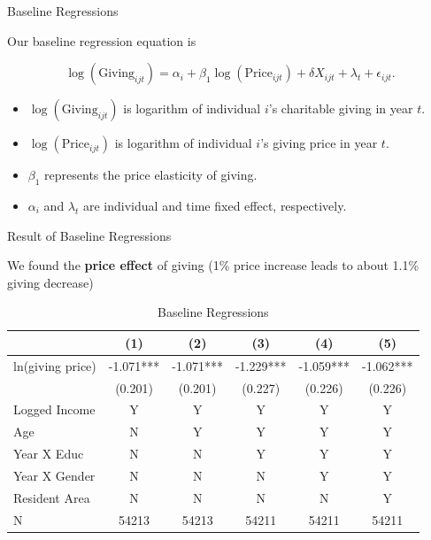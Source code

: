 \documentclass[
  ignorenonframetext,
]{beamer}
\providecommand{\tightlist}{%
  \setlength{\itemsep}{0pt}\setlength{\parskip}{0pt}}
\begin{document}
\begin{frame}{Baseline Regressions}
\protect\hypertarget{baseline-regressions}{}

Our baseline regression equation is

\[
    \log(\text{Giving}_{ijt}) = 
    \alpha_i + \beta_1 \log(\text{Price}_{ijt}) + \delta X_{ijt} + \lambda_t + \epsilon_{ijt}.
\]

\begin{itemize}
\tightlist
\item
  \(\log(\text{Giving}_{ijt})\) is logarithm of individual \(i\)'s
  charitable giving in year \(t\).
\item
  \(\log(\text{Price}_{ijt})\) is logarithm of individual \(i\)'s giving
  price in year \(t\).
\item
  \(\beta_1\) represents the price elasticity of giving.
\item
  \(\alpha_i\) and \(\lambda_t\) are individual and time fixed effect,
  respectively.
\end{itemize}

\end{frame}

\begin{frame}{Result of Baseline Regressions}
\protect\hypertarget{result-of-baseline-regressions}{}

We found the \textbf{price effect} of giving (1\% price increase leads
to about 1.1\% giving decrease)

\begin{table}

\caption{\label{tab:kableEstimateElasticity}Baseline Regressions}
\centering
\fontsize{9}{11}\selectfont
\begin{tabular}[t]{lccccc}
\toprule
 & (1) & (2) & (3) & (4) & (5)\\
\midrule
ln(giving price) & -1.071*** & -1.071*** & -1.229*** & -1.059*** & -1.062***\\
 & (0.201) & (0.201) & (0.227) & (0.226) & (0.226)\\
Logged Income & Y & Y & Y & Y & Y\\
Age & N & Y & Y & Y & Y\\
Year X Educ & N & N & Y & Y & Y\\
Year X Gender & N & N & N & Y & Y\\
Resident Area & N & N & N & N & Y\\
N & 54213 & 54213 & 54211 & 54211 & 54211\\
\bottomrule
\end{tabular}
\end{table}

\end{frame}
\end{document}
